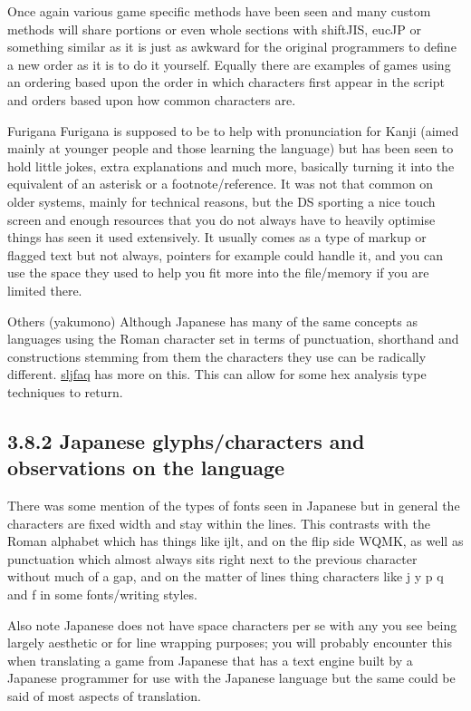 \documentclass[
]{book}
\begin{document}
Once again various game specific methods have been seen and many custom methods will share portions or even whole sections with shiftJIS, eucJP or something similar as it is just as awkward for the original programmers to define a new order as it is to do it yourself. Equally there are examples of games using an ordering based upon the order in which characters first appear in the script and orders based upon how common characters are.

Furigana Furigana is supposed to be to help with pronunciation for Kanji (aimed mainly at younger people and those learning the language) but has been seen to hold little jokes, extra explanations and much more, basically turning it into the equivalent of an asterisk or a footnote/reference. It was not that common on older systems, mainly for technical reasons, but the DS sporting a nice touch screen and enough resources that you do not always have to heavily optimise things has seen it used extensively. It usually comes as a type of markup or flagged text but not always, pointers for example could handle it, and you can use the space they used to help you fit more into the file/memory if you are limited there.

Others (yakumono) Although Japanese has many of the same concepts as languages using the Roman character set in terms of punctuation, shorthand and constructions stemming from them the characters they use can be radically different. \href{http://www.sljfaq.org/afaq/symbol.html}{sljfaq} has more on this. This can allow for some hex analysis type techniques to return.

\hypertarget{japanese-glyphscharacters-and-observations-on-the-language}{%
\subsection{3.8.2 Japanese glyphs/characters and observations on the language}\label{japanese-glyphscharacters-and-observations-on-the-language}}

There was some mention of the types of fonts seen in Japanese but in general the characters are fixed width and stay within the lines. This contrasts with the Roman alphabet which has things like ijlt, and on the flip side WQMK, as well as punctuation which almost always sits right next to the previous character without much of a gap, and on the matter of lines thing characters like j y p q and f in some fonts/writing styles.

Also note Japanese does not have space characters per se with any you see being largely aesthetic or for line wrapping purposes; you will probably encounter this when translating a game from Japanese that has a text engine built by a Japanese programmer for use with the Japanese language but the same could be said of most aspects of translation.
\end{document}

